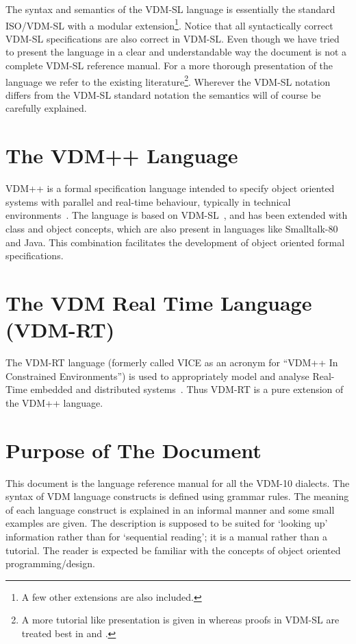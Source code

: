 \documentclass{overturerepchap}
\begin{document}
The syntax and semantics of the VDM-SL
language is essentially the standard ISO/VDM-SL \cite{ISOVDM96}
with a modular extension\footnote{A few other extensions are also included.}.
Notice that all syntactically correct VDM-SL specifications are also correct in
 VDM-SL. 
Even though we have tried to present the language in a
clear and understandable way the document is not a complete VDM-SL
reference manual. 
For a more thorough presentation of the language we refer to the
existing literature\footnote{A more tutorial like
presentation is given in \cite{Fitzgerald&98} whereas proofs in VDM-SL
are treated best in \cite{Jones90a} and \cite{Bicarregui&94}.}.
Wherever the  VDM-SL notation differs from
the VDM-SL standard notation the semantics will of course be carefully
explained.

\section{The VDM++ Language}

VDM++ is a formal specification language intended to specify object
oriented systems with parallel and real-time behaviour, typically in
technical environments~\cite{Fitzgerald&05}.  The language is based on
VDM-SL~\cite{ISOVDM96}, and has been extended with class and object
concepts, which are also present in languages like Smalltalk-80 and
Java.  This combination facilitates the development of object oriented
formal specifications.

\section{The VDM Real Time Language (VDM-RT)}

The VDM-RT language (formerly called VICE as an acronym for ``VDM++ In
Constrained Environments'') is used to appropriately model and analyse
Real-Time embedded and distributed
systems~\cite{Mukherjee&00,Verhoef&06b,Verhoef&07,Verhoef08,Larsen&09b}. Thus
VDM-RT is a pure extension of the VDM++ language.


\section{Purpose of The Document}

This document is the language reference manual for all the VDM-10 dialects.  The
syntax of VDM language constructs is defined using grammar rules.
The meaning of each language construct is explained in an informal
manner and some small examples are given. The description is supposed
to be suited for `looking up' information rather than for `sequential
reading'; it is a manual rather than a tutorial.  The reader is
expected be familiar with the concepts of object oriented
programming/design.
\end{document}
